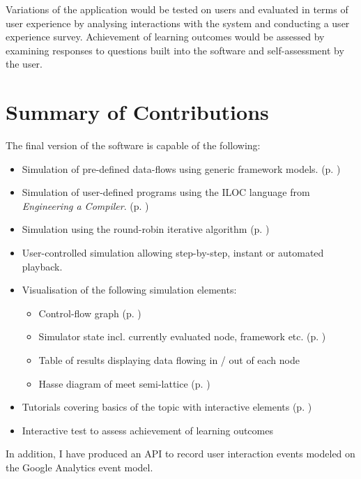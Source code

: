 \documentclass[bsc,twoside,singlespacing,parskip,logo,notimes,normalheadings]{infthesis}
\begin{document}
    Variations of the application would be tested on users and
    evaluated in terms of user experience by analysing interactions
    with the system and conducting a user experience
    survey. Achievement of learning outcomes would be assessed by
    examining responses to questions built into the software and
    self-assessment by the user.
    
    \section{Summary of Contributions}
    The final version of the software is capable of the following:
    
    \begin{itemize}
    \item Simulation of pre-defined data-flows using generic framework
      models. (p. )%
    \item Simulation of user-defined programs using the
      ILOC\cite[appx.~A]{eac} language from {\em Engineering a
        Compiler}. (p. )%
    \item Simulation using the round-robin iterative algorithm (p.
      ) %
    \item User-controlled simulation allowing step-by-step, instant or
      automated playback.
    \item Visualisation of the following simulation elements:
      \begin{itemize}
      \item Control-flow graph (p. )%
      \item Simulator state incl. currently evaluated node,
        framework etc. (p. )%
      \item Table of results displaying data flowing in / out of each
        node
      \item Hasse diagram of meet semi-lattice (p.
        ) %
      \end{itemize}
    \item Tutorials covering basics of the topic with interactive
      elements (p. )%
    \item Interactive test to assess achievement of learning outcomes
    \end{itemize}

    In addition, I have produced an API to record user interaction
    events modeled on the Google Analytics event model.
\end{document}
